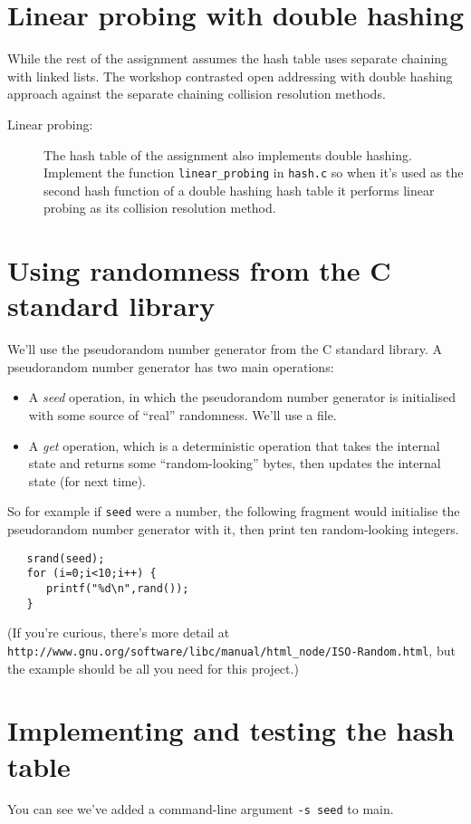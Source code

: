 \documentclass[11pt]{article}
\begin{document}
\section*{Linear probing with double hashing}
While the rest of the assignment assumes the hash table uses separate chaining with linked lists.
The workshop contrasted open addressing with double hashing approach against the separate chaining collision resolution methods.

\begin{description}
    \item[Linear probing:]
        The hash table of the assignment also implements double hashing.
        Implement the function {\tt linear\_probing} in {\tt hash.c}
        so when it's used as the second hash function of a double
        hashing hash table it performs linear probing as its collision
        resolution method.
\end{description}

\section*{Using randomness from the C standard library}
We'll use the pseudorandom number generator from the C standard library.  A
pseudorandom number generator has two main operations:
\begin{itemize}
\item A \emph{seed} operation, in which the pseudorandom number generator is
    initialised with some source of ``real'' randomness.  We'll use a file.
\item A \emph{get} operation, which is a deterministic operation that takes the
    internal state and returns some ``random-looking'' bytes, then updates the
        internal state (for next time).
\end{itemize}
So for example if {\tt seed} were a number, the following fragment would
initialise the pseudorandom number generator with it, then print ten
random-looking integers.

\begin{verbatim}
   srand(seed);
   for (i=0;i<10;i++) {
      printf("%d\n",rand());
   }
\end{verbatim}

(If you're curious, there's more detail at
{\tt http://www.gnu.org/software/libc/manual/html\_node/ISO-Random.html},
but the example should be all you need for this project.)

\section*{Implementing and testing the hash table} You can see we've added a
command-line argument {\tt -s seed} to main.
\end{document}
